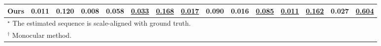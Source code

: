 \begin{table}[ht]
{\begin{tabular}{lcccccccccccccc}
\midrule 
\textbf{Ours}                           & 0.011          & 0.120 & \textbf{0.008} & \textbf{0.058} & \underline{0.033} & \underline{0.168} & \underline{0.017} & 0.090 & \textbf{0.016} & \underline{0.085} & \underline{0.011} & \underline{0.162} & \textbf{0.027} & \underline{0.604} \\
\bottomrule
\multicolumn{10}{l}{\small{$^\star$ The estimated sequence is scale-aligned with ground truth.}}\\
\multicolumn{10}{l}{\small{$^\dagger$ Monocular method.}}\\
\end{tabular}
}
\label{tab: TartanAirHard Even}
\end{table}

